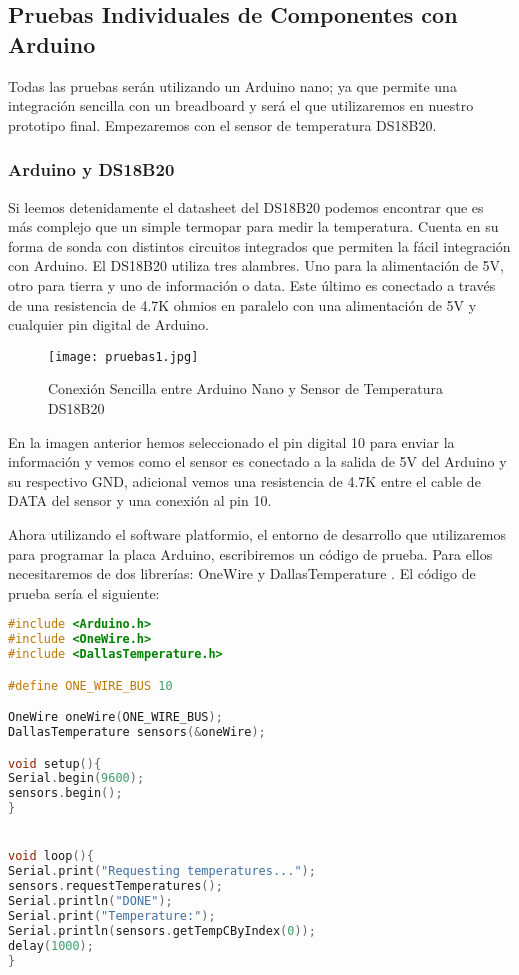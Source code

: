 \subsection{Pruebas Individuales de Componentes con Arduino }
\par \noindent
Todas las pruebas serán utilizando un Arduino nano; ya que permite una integración sencilla con un breadboard y será el que utilizaremos en nuestro prototipo final. Empezaremos con el sensor de temperatura DS18B20.

\subsubsection{Arduino y DS18B20}
\par 
Si leemos detenidamente el datasheet del DS18B20 podemos encontrar que es más complejo que un simple termopar para medir la temperatura. Cuenta en su forma de sonda con distintos circuitos integrados que permiten la fácil integración con Arduino. El DS18B20 utiliza tres alambres. Uno para la alimentación de 5V, otro para tierra y uno de información o data. Este último es conectado a través de una resistencia de 4.7K ohmios en paralelo con una alimentación de 5V y cualquier pin digital de Arduino. 

\begin{figure}[H]
	\centering
	\texttt{[image: pruebas1.jpg]}
	\caption{Conexión Sencilla entre Arduino Nano y Sensor de Temperatura DS18B20}
\end{figure}

\par \noindent
En la imagen anterior hemos seleccionado el pin digital 10 para enviar la información y vemos como el sensor es conectado a la salida de 5V del Arduino y su respectivo GND, adicional vemos una resistencia de 4.7K entre el cable de DATA del sensor y una conexión al pin 10. 

\par \noindent
Ahora utilizando el software platformio, el entorno de desarrollo que utilizaremos para programar la placa Arduino, escribiremos un código de prueba. Para ellos necesitaremos de dos librerías: OneWire \cite{onewire-github} y DallasTemperature \cite{dallas-github}. El código de prueba sería el siguiente: \\

\begin{lstlisting}[language=C++, caption={Código Ejemplo para DS18B20}, captionpos=b]
#include <Arduino.h>
#include <OneWire.h>
#include <DallasTemperature.h>

#define ONE_WIRE_BUS 10

OneWire oneWire(ONE_WIRE_BUS);
DallasTemperature sensors(&oneWire);

void setup(){
Serial.begin(9600);
sensors.begin();
}


void loop(){
Serial.print("Requesting temperatures...");
sensors.requestTemperatures(); 
Serial.println("DONE");
Serial.print("Temperature:");
Serial.println(sensors.getTempCByIndex(0));
delay(1000);
}
\end{lstlisting}

